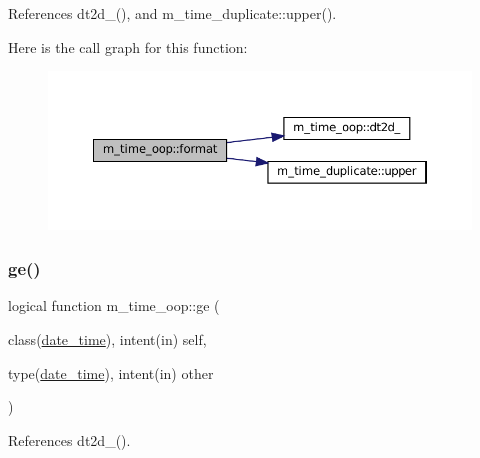 References dt2d\+\_\+(), and m\+\_\+time\+\_\+duplicate\+::upper().

Here is the call graph for this function\+:\nopagebreak
\begin{figure}[H]
\begin{center}
\leavevmode
\includegraphics[width=350pt]{namespacem__time__oop_a78bb598e3481faa48df9733a3f9ae060_cgraph}
\end{center}
\end{figure}
\mbox{\label{namespacem__time__oop_aeea1131ab511b897168f00a908b75458}} 
\subsubsection{\texorpdfstring{ge()}{ge()}}
{\footnotesize\ttfamily logical function m\+\_\+time\+\_\+oop\+::ge (\begin{DoxyParamCaption}\item[{class(\mbox{\hyperlink{structm__time__oop_1_1date__time}{date\+\_\+time}}), intent(in)}]{self,  }\item[{type(\mbox{\hyperlink{structm__time__oop_1_1date__time}{date\+\_\+time}}), intent(in)}]{other }\end{DoxyParamCaption})\hspace{0.3cm}{\ttfamily [private]}}



References dt2d\+\_\+().

